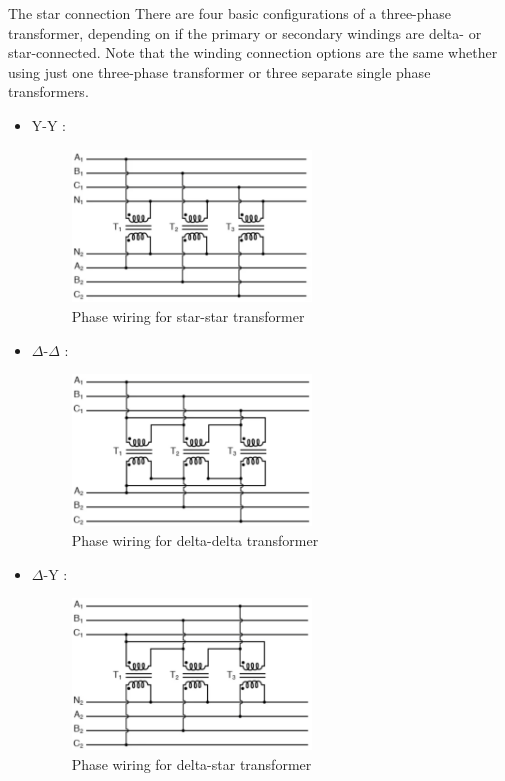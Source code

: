 \documentclass[12pt,a4paper]{report}
\begin{document}
The star connection 
There are four basic configurations of a three-phase transformer, depending on if the primary or secondary windings are delta- or star-connected. Note that the winding connection options are the same whether using just one three-phase transformer or three separate single phase transformers.
\begin{itemize}
    \item Y-Y :
    
    \begin{figure}[h]
    \centering
    \includegraphics[width=0.6\textwidth]{y-y.PNG}
    \caption{Phase wiring for star-star transformer}
    \label{fig:star-star transformer}
    \end{figure}
    
    \item $\Delta$-$\Delta$ :
       
    \begin{figure}[h]
    \centering
    \includegraphics[width=0.6\textwidth]{delta-delta.PNG}
    \caption{Phase wiring for delta-delta transformer}
    \label{fig:delta-delta transformer}
    \end{figure}
    
    \item $\Delta$-Y :
       
    \begin{figure}[h]
    \centering
    \includegraphics[width=0.6\textwidth]{delta-y.PNG}
    \caption{Phase wiring for delta-star transformer}
    \label{fig:delta-star transformer}
    \end{figure}
    

\end{itemize}
\end{document}
